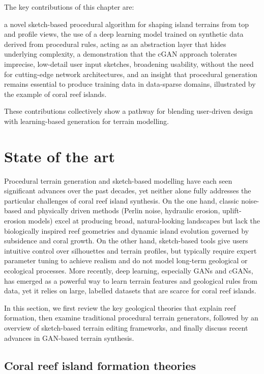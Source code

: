The key contributions of this chapter are:
\begin{Itemize}
    \Item{} a novel sketch-based procedural algorithm for shaping island terrains from top and profile views,
    \Item{} the use of a deep learning model trained on synthetic data derived from procedural rules, acting as an abstraction layer that hides underlying complexity,
    \Item{} a demonstration that the cGAN approach tolerates imprecise, low-detail user input sketches, broadening usability, without the need for cutting-edge network architectures,
    \Item{} and an insight that procedural generation remains essential to produce training data in data-sparse domains, illustrated by the example of coral reef islands.
\end{Itemize}
These contributions collectively show a pathway for blending user-driven design with learning-based generation for terrain modelling.

\section{State of the art}
\label{sec:coral-island-SotA}

Procedural terrain generation and sketch-based modelling have each seen significant advances over the past decades, yet neither alone fully addresses the particular challenges of coral reef island synthesis. On the one hand, classic noise-based and physically driven methods (Perlin noise, hydraulic erosion, uplift-erosion models) excel at producing broad, natural-looking landscapes but lack the biologically inspired reef geometries and dynamic island evolution governed by subsidence and coral growth. On the other hand, sketch-based tools give users intuitive control over silhouettes and terrain profiles, but typically require expert parameter tuning to achieve realism and do not model long-term geological or ecological processes. More recently, deep learning, especially GANs and cGANs, has emerged as a powerful way to learn terrain features and geological rules from data, yet it relies on large, labelled datasets that are scarce for coral reef islands. 

In this section, we first review the key geological theories that explain reef formation, then examine traditional procedural terrain generators, followed by an overview of sketch-based terrain editing frameworks, and finally discuss recent advances in GAN-based terrain synthesis.

\subsection{Coral reef island formation theories}
\label{sec:coral-island-sota-coral-theories}

